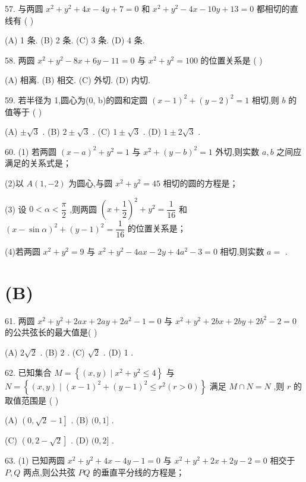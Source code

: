 57. 与两圆 ${x}^{2} + {y}^{2} + {4x} - {4y} + 7 = 0$ 和 ${x}^{2} + {y}^{2} - {4x} - {10y} + {13} = 0$ 都相切的直线有 (   )

(A) 1 条. (B) 2 条. (C) 3 条. (D) 4 条.

58. 两圆 ${x}^{2} + {y}^{2} - {8x} + {6y} - {11} = 0$ 与 ${x}^{2} + {y}^{2} = {100}$ 的位置关系是 (   )

(A) 相离. (B) 相交. (C) 外切. (D) 内切.

59. 若半径为 1,圆心为(0, b)的圆和定圆 ${\left( x - 1\right) }^{2} + {\left( y - 2\right) }^{2} = 1$ 相切,则 $b$ 的值等于 (   )

(A) $\pm  \sqrt{3}$ . (B) $2 \pm  \sqrt{3}$ . (C) $1 \pm  \sqrt{3}$ . (D) $1 \pm  2\sqrt{3}$ .

60. (1) 若两圆 ${\left( x - a\right) }^{2} + {y}^{2} = 1$ 与 ${x}^{2} + {\left( y - b\right) }^{2} = 1$ 外切,则实数 $a,b$ 之间应满足的关系式是\blkda{}；

(2)以 $A\left( {1, - 2}\right)$ 为圆心,与圆 ${x}^{2} + {y}^{2} = {45}$ 相切的圆的方程是\blkda{}；

(3) 设 $0 < \alpha  < \dfrac{\pi }{2}$ ,则两圆 ${\left( x + \dfrac{1}{2}\right) }^{2} + {y}^{2} = \dfrac{1}{16}$ 和 ${\left( x - \sin \alpha \right) }^{2} + {\left( y - 1\right) }^{2} = \dfrac{1}{16}$ 的位置关系是\blkda{}；

(4)若两圆 ${x}^{2} + {y}^{2} = 9$ 与 ${x}^{2} + {y}^{2} - {4ax} - {2y} + 4{a}^{2} - 3 = 0$ 相切,则实数 $a =$ \blkda{}.

\section*{(B)}

61. 两圆 ${x}^{2} + {y}^{2} + {2ax} + {2ay} + 2{a}^{2} - 1 = 0$ 与 ${x}^{2} + {y}^{2} + {2bx} + {2by} + 2{b}^{2} - 2 = 0$ 的公共弦长的最大值是(   )

(A) $2\sqrt{2}$ . (B) 2 . (C) $\sqrt{2}$ . (D) 1 .

62. 已知集合 $M = \left\{  {\left( {x,y}\right)  \mid  {x}^{2} + {y}^{2} \leq  4}\right\}$ 与 $N = \left\{  {\left( {x,y}\right)  \mid  {\left( x - 1\right) }^{2} + {\left( y - 1\right) }^{2} \leq  {r}^{2}\left( {r > 0}\right) }\right\}$ 满足 $M \cap  N = N$ ,则 $r$ 的取值范围是 (   )

(A) $\left( {0,\sqrt{2} - 1}\right\rbrack$ . (B) $(0,1\rbrack$ .

(C) $\left( {0,2 - \sqrt{2}}\right\rbrack$ . (D) $(0,2\rbrack$ .

63. (1) 已知两圆 ${x}^{2} + {y}^{2} + {4x} - {4y} - 1 = 0$ 与 ${x}^{2} + {y}^{2} + {2x} + {2y} - 2 = 0$ 相交于 $P,Q$ 两点,则公共弦 ${PQ}$ 的垂直平分线的方程是\blkda{}；

